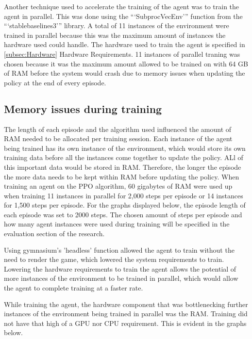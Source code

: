 Another technique used to accelerate the training of the agent was to train the agent in parallel. This was done using the ```SubprocVecEnv''' function from the ```stablebaselines3''' library. A total of 11 instances of the environment were trained in parallel because this was the maximum amount of instances the hardware used could handle. The hardware used to train the agent is specified in \ref{subsec:Hardware} Hardware Requirements. 11 instances of parallel traning was chosen because it was the maximum amount allowed to be trained on with 64 GB of RAM before the system would crash due to memory issues when updating the policy at the end of every episode. 

\subsection{Memory issues during training}

The length of each episode and the algorithm used influenced the amount of RAM needed to be allocated per training session. Each instance of the agent being trained has its own instance of the environment, which would store its own training data before all the instances come together to update the policy. ALl of this important data would be stored in RAM. Therefore, the longer the episode the more data needs to be kept within RAM before updating the policy. When training an agent on the PPO algorithm, 60 gigabytes of RAM were used up when training 11 instances in parallel for 2,000 steps per episode or 14 instances for 1,500 steps per episode. For the graphs displayed below, the episode length of each episode was set to 2000 steps. The chosen amount of steps per episode and how many agent instances were used during training will be specified in the evaluation section of the research. 

Using gymnasium's 'headless' function allowed the agent to train without the need to render the game, which lowered the system requirements to train. Lowering the hardware requirements to train the agent allows the potential of more instances of the environment to be trained in parallel, which would allow the agent to complete training at a faster rate.

While training the agent, the hardware component that was bottlenecking further instances of the environment being trained in parallel was the RAM. Training did not have that high of a GPU nor CPU requirement. This is evident in the graphs below. 

